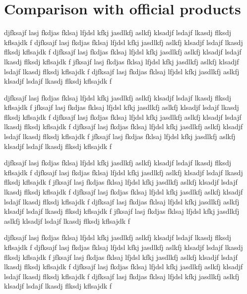 \documentclass[twocolumn]{../../common/aa}
\begin{document}
\section{Comparison with official products}

djfksajf lasj fkdjas fklsaj lfjdsl kfkj jasdlkfj aslkfj klsadjf lsdajf lkasdj flksdj kflsajdk f
djfksajf lasj fkdjas fklsaj lfjdsl kfkj jasdlkfj aslkfj klsadjf lsdajf lkasdj flksdj kflsajdk f
djfksajf lasj fkdjas fklsaj lfjdsl kfkj jasdlkfj aslkfj klsadjf lsdajf lkasdj flksdj kflsajdk f
jfksajf lasj fkdjas fklsaj lfjdsl kfkj jasdlkfj aslkfj klsadjf lsdajf lkasdj flksdj kflsajdk f
djfksajf lasj fkdjas fklsaj lfjdsl kfkj jasdlkfj aslkfj klsadjf lsdajf lkasdj flksdj kflsajdk f

djfksajf lasj fkdjas fklsaj lfjdsl kfkj jasdlkfj aslkfj klsadjf lsdajf lkasdj flksdj kflsajdk f
jfksajf lasj fkdjas fklsaj lfjdsl kfkj jasdlkfj aslkfj klsadjf lsdajf lkasdj flksdj kflsajdk f
djfksajf lasj fkdjas fklsaj lfjdsl kfkj jasdlkfj aslkfj klsadjf lsdajf lkasdj flksdj kflsajdk f
djfksajf lasj fkdjas fklsaj lfjdsl kfkj jasdlkfj aslkfj klsadjf lsdajf lkasdj flksdj kflsajdk f
jfksajf lasj fkdjas fklsaj lfjdsl kfkj jasdlkfj aslkfj klsadjf lsdajf lkasdj flksdj kflsajdk f

djfksajf lasj fkdjas fklsaj lfjdsl kfkj jasdlkfj aslkfj klsadjf lsdajf lkasdj flksdj kflsajdk f
djfksajf lasj fkdjas fklsaj lfjdsl kfkj jasdlkfj aslkfj klsadjf lsdajf lkasdj flksdj kflsajdk f
jfksajf lasj fkdjas fklsaj lfjdsl kfkj jasdlkfj aslkfj klsadjf lsdajf lkasdj flksdj kflsajdk f
djfksajf lasj fkdjas fklsaj lfjdsl kfkj jasdlkfj aslkfj klsadjf lsdajf lkasdj flksdj kflsajdk f
djfksajf lasj fkdjas fklsaj lfjdsl kfkj jasdlkfj aslkfj klsadjf lsdajf lkasdj flksdj kflsajdk f
jfksajf lasj fkdjas fklsaj lfjdsl kfkj jasdlkfj aslkfj klsadjf lsdajf lkasdj flksdj kflsajdk f

djfksajf lasj fkdjas fklsaj lfjdsl kfkj jasdlkfj aslkfj klsadjf lsdajf lkasdj flksdj kflsajdk f
djfksajf lasj fkdjas fklsaj lfjdsl kfkj jasdlkfj aslkfj klsadjf lsdajf lkasdj flksdj kflsajdk f
jfksajf lasj fkdjas fklsaj lfjdsl kfkj jasdlkfj aslkfj klsadjf lsdajf lkasdj flksdj kflsajdk f
djfksajf lasj fkdjas fklsaj lfjdsl kfkj jasdlkfj aslkfj klsadjf lsdajf lkasdj flksdj kflsajdk f
djfksajf lasj fkdjas fklsaj lfjdsl kfkj jasdlkfj aslkfj klsadjf lsdajf lkasdj flksdj kflsajdk f

\end{document}
